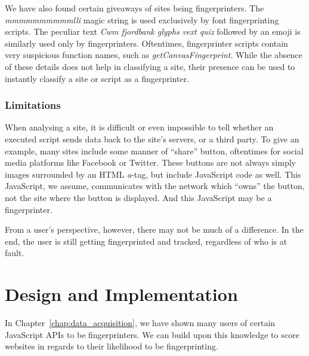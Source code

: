 \documentclass[
    fontsize=12pt,
    headings=small,
    parskip=half,
    bibliography=totoc,
    numbers=noenddot,
    open=any
    ]{scrreprt}
\begin{document}
We have also found certain giveaways of sites being fingerprinters.
The \textit{mmmmmmmmmmlli} magic string is used exclusively by font fingerprinting scripts.
The peculiar text \textit{Cwm fjordbank glyphs vext quiz} followed by an emoji is similarly used only
by fingerprinters.
Oftentimes, fingerprinter scripts contain very suspicious function names, such as \textit{getCanvasFingerprint}.
While the absence of these details does not help in classifying a site,
their presence can be used to instantly classify a site or script as a fingerprinter.


\subsection{Limitations}
When analysing a site, it is difficult or even impossible to tell whether an executed
script sends data back to the site's servers, or a third party.
To give an example, many sites include some manner of ``share'' button,
oftentimes for social media platforms like Facebook or Twitter.
These buttons are not always simply images surrounded by an HTML \textit{a}-tag,
but include JavaScript code as well.
This JavaScript, we assume, communicates with the network which ``owns''
the button, not the site where the button is displayed.
And this JavaScript may be a fingerprinter.

From a user's perspective, however, there may not be much of a difference.
In the end, the user is still getting fingerprinted and tracked, regardless
of who is at fault.




\chapter{Design and Implementation}
\label{chap:implementation}
In Chapter~\ref{chap:data_acquisition}, we have shown many users of certain JavaScript APIs to be fingerprinters.
We can build upon this knowledge to score websites in regards to their likelihood to be fingerprinting.
\end{document}
